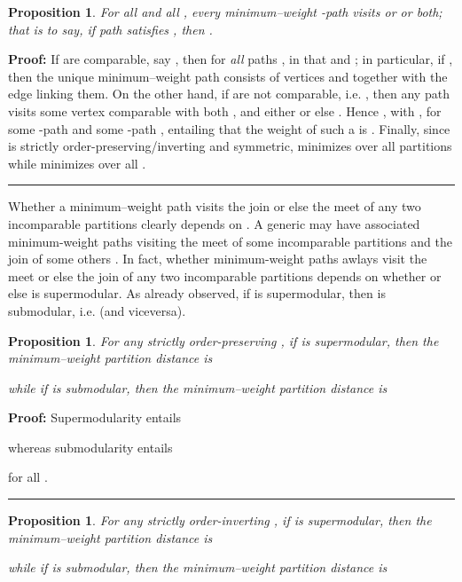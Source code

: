 \documentclass[a4paper,10pt]{article}
\newtheorem{proposition}[theorem]{Proposition}
\newenvironment{proof}[1][Proof]{\noindent\textbf{#1: }}{\ \rule{0.5em}{0.5em}}
\begin{document}
\begin{proposition}
For all  and all , every minimum--weight -path visits  or  or both; that is to say, if path  satisfies
, then .
\end{proposition}

\begin{proof}
If  are comparable, say , then  for \textit{all} paths , in that  and ;
in particular, if , then the unique minimum--weight  path consists of vertices  and  together with the edge  linking them. On the
other hand, if  are not comparable, i.e. , then any path  visits some vertex  comparable with both , and either  or
else . Hence , with , for some -path  and some -path , entailing that the weight
of such a  is . Finally, since  is strictly order-preserving/inverting and symmetric,  minimizes
 over all partitions  while  minimizes  over all .
\end{proof}

Whether a minimum--weight path visits the join or else the meet of any two incomparable partitions clearly depends on . A generic  may have associated
minimum-weight paths visiting the meet of some incomparable partitions  and the join of some others . In fact, whether minimum-weight paths awlays visit the meet or
else the join of any two incomparable partitions depends on whether  or else  is supermodular. As already observed, if  is supermodular, then  is submodular, i.e.
 (and viceversa).

\begin{proposition}
For any strictly order-preserving , if  is supermodular, then the minimum--weight partition distance is

while if  is submodular, then the minimum--weight partition distance is

\end{proposition}

\begin{proof}
Supermodularity entails

whereas submodularity entails

for all .
\end{proof}

\begin{proposition}
For any strictly order-inverting , if  is supermodular, then the minimum--weight partition distance is

while if  is submodular, then the minimum--weight partition distance is

\end{proposition}
\end{document}
